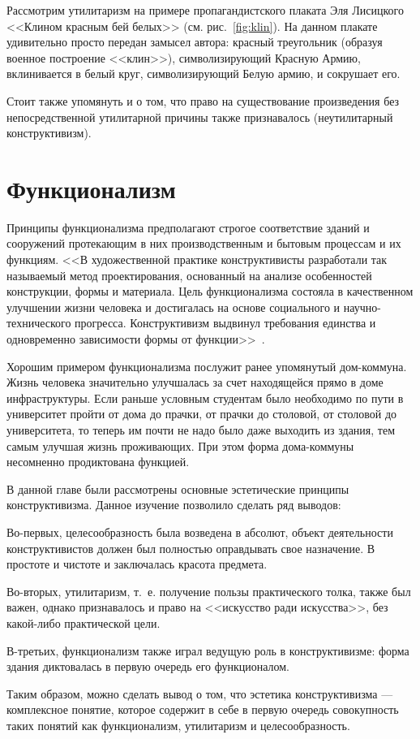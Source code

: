 Рассмотрим утилитаризм на примере пропагандистского плаката Эля Лисицкого <<Клином красным бей белых>> (см. рис.~\ref{fig:klin}).
На данном плакате удивительно просто передан замысел автора: красный треугольник (образуя военное построение <<клин>>),
символизирующий Красную Армию, вклинивается в белый круг, символизирующий Белую армию, и сокрушает его.

Стоит также упомянуть и о том, что право на существование произведения без непосредственной утилитарной причины
также признавалось (неутилитарный конструктивизм).

\section{Функционализм}
Принципы функционализма предполагают строгое соответствие зданий и сооружений протекающим в них
производственным и бытовым процессам и их функциям.
<<В художественной практике конструктивисты разработали так называемый метод проектирования,
основанный на анализе особенностей конструкции, формы и материала.
Цель функционализма состояла в качественном улучшении жизни человека и
достигалась на основе социального и научно\--тех\-ни\-че\-ско\-го прогресса.
Конструктивизм выдвинул требования единства и одновременно зависимости формы от функции>>~\cite{пунанова2016эстетические}.

Хорошим примером функционализма послужит ранее упомянутый дом-коммуна.
Жизнь человека значительно улучшалась за счет находящейся прямо в доме инфраструктуры.
Если раньше условным студентам было необходимо по пути в университет пройти
от дома до прачки, от прачки до столовой, от столовой до университета,
то теперь им почти не надо было даже выходить из здания,
тем самым улучшая жизнь проживающих.
При этом форма дома-коммуны несомненно продиктована функцией.

В данной главе были рассмотрены основные эстетические принципы конструктивизма.
Данное изучение позволило сделать ряд выводов:

Во-первых, целесообразность была возведена в абсолют, объект
деятельности конструктивистов должен был полностью оправдывать свое назначение.
В простоте и чистоте и заключалась красота предмета.

Во-вторых, утилитаризм, т.~е. получение пользы практического толка, также был важен, однако признавалось и право
на <<искусство ради искусства>>, без какой-либо практической цели.

В-третьих, функционализм также играл ведущую роль в конструктивизме:
форма здания диктовалась в первую очередь его функционалом.

Таким образом, можно сделать вывод о том, что эстетика конструктивизма --- комплексное понятие,
которое содержит в себе в первую очередь совокупность таких понятий как функционализм, утилитаризм и целесообразность.